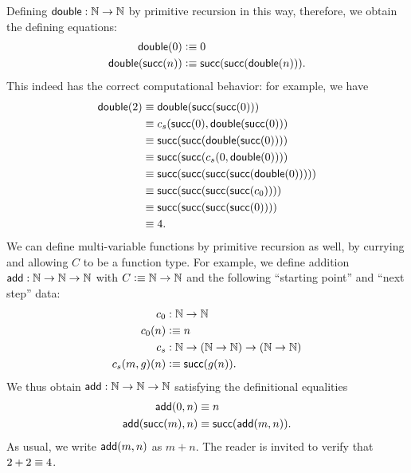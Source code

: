 Defining $\mathsf{double}:\mathbb{N}\to\mathbb{N}$ by primitive recursion in this way, therefore, we obtain the defining equations:
\begin{align*}
  \mathsf{double}(0) &\vcentcolon\equiv 0\\
  \mathsf{double}(\mathsf{succ}(n)) &\vcentcolon\equiv \mathsf{succ}(\mathsf{succ}(\mathsf{double}(n))).
\end{align*}
This indeed has the correct computational behavior: for example, we have 
\begin{align*}
  \mathsf{double}(2) &\equiv \mathsf{double}(\mathsf{succ}(\mathsf{succ}(0)))\\
  & \equiv c_s(\mathsf{succ}(0), \mathsf{double}(\mathsf{succ}(0))) \\
                 & \equiv \mathsf{succ}(\mathsf{succ}(\mathsf{double}(\mathsf{succ}(0)))) \\
                 & \equiv \mathsf{succ}(\mathsf{succ}(c_s(0,\mathsf{double}(0)))) \\
                 & \equiv \mathsf{succ}(\mathsf{succ}(\mathsf{succ}(\mathsf{succ}(\mathsf{double}(0))))) \\
                 & \equiv \mathsf{succ}(\mathsf{succ}(\mathsf{succ}(\mathsf{succ}(c_0)))) \\
                 & \equiv \mathsf{succ}(\mathsf{succ}(\mathsf{succ}(\mathsf{succ}(0))))\\
                 &\equiv 4.
\end{align*}
We can define multi-variable functions by primitive recursion as well, by currying and allowing $C$ to be a function type.
For example, we define addition $\mathsf{add} : \mathbb{N} \to \mathbb{N} \to \mathbb{N}$ with $C \vcentcolon\equiv \mathbb{N} \to \mathbb{N}$ and the following ``starting point'' and ``next step'' data:
\begin{align*}
  c_0 & : \mathbb{N} \to \mathbb{N} \\
  c_0 (n) & \vcentcolon\equiv n \\
  c_s & : \mathbb{N} \to (\mathbb{N} \to \mathbb{N}) \to (\mathbb{N} \to \mathbb{N}) \\
  c_s(m,g)(n) & \vcentcolon\equiv \mathsf{succ}(g(n)).
\end{align*}
We thus obtain $\mathsf{add} : \mathbb{N} \to \mathbb{N} \to \mathbb{N}$ satisfying the definitional equalities
\begin{align*}
  \mathsf{add}(0,n) &\equiv n \\
  \mathsf{add}(\mathsf{succ}(m),n) &\equiv \mathsf{succ}(\mathsf{add}(m,n)). 
\end{align*}
As usual, we write $\mathsf{add}(m,n)$ as $m+n$.
The reader is invited to verify that $2+2\equiv 4$.

